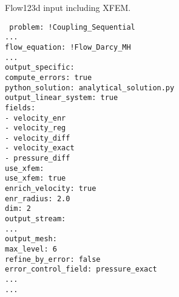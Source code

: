 \vspace{0.5cm}
\begin{code}
\caption{Flow123d input including XFEM.}
\label{code:flow123d_input}
\texttt{
problem: !Coupling\_Sequential \\
\mbox{}\phantom{mm} ... \\
\mbox{}\phantom{mm}    flow\_equation: !Flow\_Darcy\_MH \\
\mbox{}\phantom{mmmm}        ... \\
\mbox{}\phantom{mmmm}        output\_specific: \\
\mbox{}\phantom{mmmmmm}            compute\_errors: true \\
\mbox{}\phantom{mmmmmm}            python\_solution: analytical\_solution.py \\
\mbox{}\phantom{mmmmmm}            output\_linear\_system: true \\
\mbox{}\phantom{mmmmmm}            fields: \\
\mbox{}\phantom{mmmmmmmm}             - velocity\_enr \\
\mbox{}\phantom{mmmmmmmm}             - velocity\_reg \\
\mbox{}\phantom{mmmmmmmm}             - velocity\_diff \\
\mbox{}\phantom{mmmmmmmm}             - velocity\_exact \\
\mbox{}\phantom{mmmmmmmm}             - pressure\_diff \\
\mbox{}\phantom{mmmm}        use\_xfem: \\
\mbox{}\phantom{mmmmmm}            use\_xfem: true \\
\mbox{}\phantom{mmmmmm}            enrich\_velocity: true \\
\mbox{}\phantom{mmmmmm}            enr\_radius: 2.0 \\
\mbox{}\phantom{mmmmmm}            dim: 2 \\
\mbox{}\phantom{mmmm}       output\_stream: \\
\mbox{}\phantom{mmmmmm}         ... \\
\mbox{}\phantom{mmmmmm}         output\_mesh: \\
\mbox{}\phantom{mmmmmmmm}        max\_level: 6 \\
\mbox{}\phantom{mmmmmmmm}        refine\_by\_error: false \\
\mbox{}\phantom{mmmmmmmm}        error\_control\_field: pressure\_exact \\
\mbox{}\phantom{mmmm}        ... \\
\mbox{}\phantom{mm} ...}
\end{code}
 
